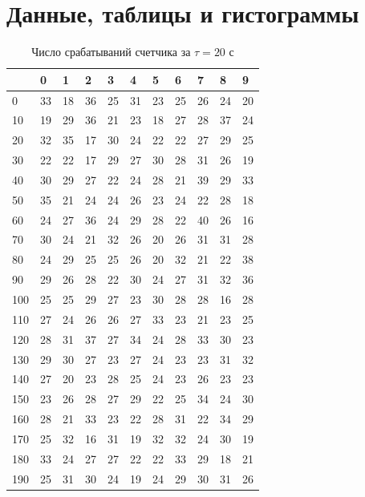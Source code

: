\documentclass[a4paper]{article}
\begin{document}
\section{Данные, таблицы и гистограммы}
\begin{table}[!h]
\begin{center}
\begin{tabular}{|l|l|l|l|l|l|l|l|l|l|l|}
\hline
        & 0  & 1  & 2  & 3  & 4  & 5  & 6  & 7  & 8  & 9  \\ \hline
0       & 33 & 18 & 36 & 25 & 31 & 23 & 25 & 26 & 24 & 20 \\ \hline
10      & 19 & 29 & 36 & 21 & 23 & 18 & 27 & 28 & 37 & 24 \\ \hline
20      & 32 & 35 & 17 & 30 & 24 & 22 & 22 & 27 & 29 & 25 \\ \hline
30      & 22 & 22 & 17 & 29 & 27 & 30 & 28 & 31 & 26 & 19 \\ \hline
40      & 30 & 29 & 27 & 22 & 24 & 28 & 21 & 39 & 29 & 33 \\ \hline
50      & 35 & 21 & 24 & 24 & 26 & 23 & 24 & 22 & 28 & 18 \\ \hline
60      & 24 & 27 & 36 & 24 & 29 & 28 & 22 & 40 & 26 & 16 \\ \hline
70      & 30 & 24 & 21 & 32 & 26 & 20 & 26 & 31 & 31 & 28 \\ \hline
80      & 24 & 29 & 25 & 25 & 26 & 20 & 32 & 21 & 22 & 38 \\ \hline
90      & 29 & 26 & 28 & 22 & 30 & 24 & 27 & 31 & 32 & 36 \\ \hline
100     & 25 & 25 & 29 & 27 & 23 & 30 & 28 & 28 & 16 & 28 \\ \hline
110     & 27 & 24 & 26 & 26 & 27 & 33 & 23 & 21 & 23 & 25 \\ \hline
120     & 28 & 31 & 37 & 27 & 34 & 24 & 28 & 33 & 30 & 23 \\ \hline
130     & 29 & 30 & 27 & 23 & 27 & 24 & 23 & 23 & 31 & 32 \\ \hline
140     & 27 & 20 & 23 & 28 & 25 & 24 & 23 & 26 & 23 & 23 \\ \hline
150     & 23 & 26 & 28 & 27 & 29 & 22 & 25 & 34 & 24 & 30 \\ \hline
160     & 28 & 21 & 33 & 23 & 22 & 28 & 31 & 22 & 34 & 29 \\ \hline
170     & 25 & 32 & 16 & 31 & 19 & 32 & 32 & 24 & 30 & 19 \\ \hline
180     & 33 & 24 & 27 & 27 & 22 & 22 & 33 & 29 & 18 & 21 \\ \hline
190     & 25 & 31 & 30 & 24 & 19 & 24 & 29 & 30 & 31 & 26 \\ \hline
\end{tabular}
\caption{Число срабатываний счетчика за $\tau = 20$ с}
\end{center}
\end{table}
\end{document}
